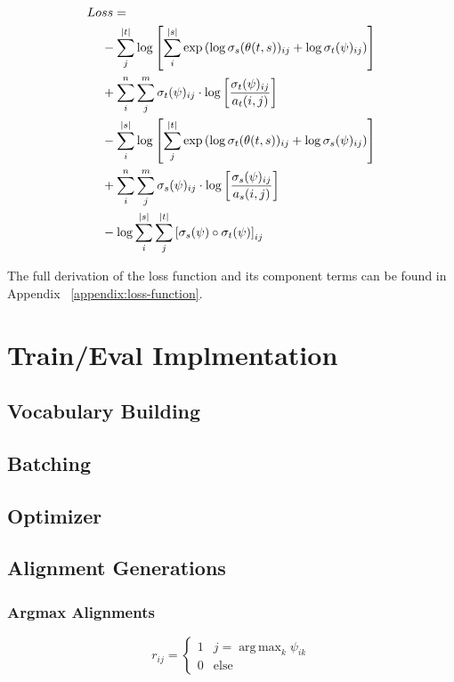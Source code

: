\documentclass[twoside,twocolumn]{article}
\DeclareMathOperator*{\argmax}{arg\,max}
\begin{document}
\begin{equation}
  \centering
\begin{split}
  Lo&ss = \\
  &- \sum_j^{|t|} \log \left[
      \sum_i^{|s|} \exp \left(
        \log \sigma_s(\theta(t, s))_{ij} + \log \sigma_t(\psi)_{ij} \right)
    \right] \\
  &+ \sum_i^n \sum_j^m \sigma_t(\psi)_{ij} \cdot \log \left[
    \frac{\sigma_t(\psi)_{ij}}{a_t(i, j)} \right] \\
  &- \sum_i^{|s|} \log \left[ \sum_j^{|t|}
      \exp \left(
        \log \sigma_t(\theta(t, s))_{ij} + \log \sigma_s(\psi)_{ij}
      \right)
    \right] \\
  &+ \sum_i^n \sum_j^m \sigma_s(\psi)_{ij} \cdot \log \left[
    \frac{\sigma_s(\psi)_{ij}}{a_s(i, j)} \right] \\
  &- \log \sum_i^{|s|} \sum_j^{|t|} \left[
    \sigma_s(\psi) \circ \sigma_t(\psi) \right]_{ij} \\
\end{split}
\end{equation}

The full derivation of the loss function and its component terms can be found in Appendix ~\ref{appendix:loss-function}.


\section{Train/Eval Implmentation}
\subsection{Vocabulary Building}
\subsection{Batching}
\subsection{Optimizer}
\subsection{Alignment Generations}
\subsubsection{Argmax Alignments}

\begin{equation}
  r_{ij} = \begin{cases}
    1 & j=\argmax_k \psi_{ik} \\
    0 & \text{else}
  \end{cases}
\end{equation}
\end{document}
